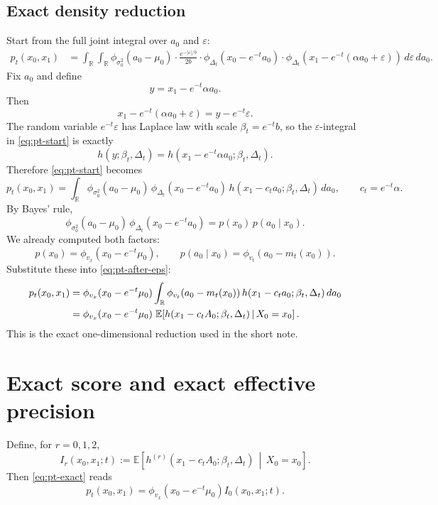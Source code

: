 \documentclass[11pt,a4paper]{article}
\newcommand{\R}{\mathbb{R}}
\newcommand{\E}{\mathbb{E}}
\newcommand{\Dt}{\Delta_t}
\newcommand{\pt}{p_t}
\begin{document}
\subsection{Exact density reduction}

Start from the full joint integral over $a_0$ and $\varepsilon$:
\begin{align}
\pt(x_0,x_1)
&=
\int_{\R} \int_{\R}
\phi_{\sigma_0^2}(a_0-\mu_0)
\cdot
\frac{e^{-|\varepsilon|/b}}{2b}
\cdot
\phi_{\Dt}(x_0-e^{-t}a_0)
\cdot
\phi_{\Dt}(x_1-e^{-t}(\alpha a_0+\varepsilon))
\, d\varepsilon \, da_0.
\label{eq:pt-start}
\end{align}
Fix $a_0$ and define
\[
y = x_1 - e^{-t} \alpha a_0.
\]
Then
\[
x_1 - e^{-t}(\alpha a_0 + \varepsilon) = y - e^{-t} \varepsilon.
\]
The random variable $e^{-t}\varepsilon$ has Laplace law with scale $\beta_t=e^{-t}b$, so the $\varepsilon$-integral in \eqref{eq:pt-start} is exactly
\begin{equation}
h(y;\beta_t,\Dt) = h(x_1-e^{-t}\alpha a_0;\beta_t,\Dt).
\label{eq:innovation-integrated}
\end{equation}
Therefore \eqref{eq:pt-start} becomes
\begin{equation}
\pt(x_0,x_1)
=
\int_{\R}
\phi_{\sigma_0^2}(a_0-\mu_0)
\, \phi_{\Dt}(x_0-e^{-t}a_0)
\, h(x_1-c_t a_0;\beta_t,\Dt)
\, da_0,
\qquad c_t=e^{-t}\alpha.
\label{eq:pt-after-eps}
\end{equation}
By Bayes' rule,
\[
\phi_{\sigma_0^2}(a_0-\mu_0)\, \phi_{\Dt}(x_0-e^{-t}a_0)
=
p(x_0)\, p(a_0\mid x_0).
\]
We already computed both factors:
\[
p(x_0)=\phi_{v_x}(x_0-e^{-t}\mu_0),
\qquad
p(a_0\mid x_0)=\phi_{v_t}(a_0-m_t(x_0)).
\]
Substitute these into \eqref{eq:pt-after-eps}:
\begin{align}
\pt(x_0,x_1)
&=
\phi_{v_x}(x_0-e^{-t}\mu_0)
\int_{\R}
\phi_{v_t}(a_0-m_t(x_0))
\, h(x_1-c_t a_0;\beta_t,\Dt)
\, da_0
\notag\\
&=
\phi_{v_x}(x_0-e^{-t}\mu_0)
\; \E\!\left[h(x_1-c_t A_0;\beta_t,\Dt)\,\middle|\, X_0=x_0\right].
\label{eq:pt-exact}
\end{align}
This is the exact one-dimensional reduction used in the short note.

\section{Exact score and exact effective precision}
\label{sec:score-hessian}

Define, for $r=0,1,2$,
\begin{equation}
I_r(x_0,x_1;t)
:=
\E\!\left[h^{(r)}(x_1-c_t A_0;\beta_t,\Dt)\,\middle|\, X_0=x_0\right].
\label{eq:Ir-def-companion}
\end{equation}
Then \eqref{eq:pt-exact} reads
\begin{equation}
\pt(x_0,x_1) = \phi_{v_x}(x_0-e^{-t}\mu_0) I_0(x_0,x_1;t).
\label{eq:pt-I0}
\end{equation}
\end{document}

